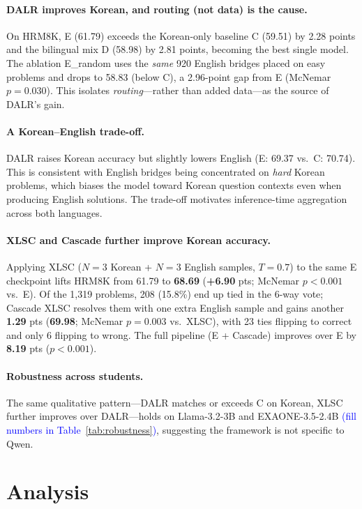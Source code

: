 \documentclass{article}
\newcommand{\note}[1]{\textcolor{blue}{{#1}}}
\begin{document}
\paragraph{DALR improves Korean, and routing (not data) is the cause.}
On HRM8K, E (61.79) exceeds the Korean-only baseline C (59.51) by 2.28
points and the bilingual mix D (58.98) by 2.81 points, becoming the
best single model. The ablation E\_random uses the \emph{same} 920
English bridges placed on easy problems and drops to 58.83 (below C),
a 2.96-point gap from E (McNemar $p{=}0.030$). This isolates
\emph{routing}---rather than added data---as the source of DALR's
gain.

\paragraph{A Korean--English trade-off.}
DALR raises Korean accuracy but slightly lowers English (E: 69.37 vs.\
C: 70.74). This is consistent with English bridges being concentrated
on \emph{hard} Korean problems, which biases the model toward Korean
question contexts even when producing English solutions. The trade-off
motivates inference-time aggregation across both languages.

\paragraph{XLSC and Cascade further improve Korean accuracy.}
Applying XLSC ($N{=}3$ Korean + $N{=}3$ English samples, $T{=}0.7$) to
the same E checkpoint lifts HRM8K from 61.79 to \textbf{68.69}
(\textbf{+6.90} pts; McNemar $p{<}0.001$ vs.\ E). Of the 1{,}319
problems, 208 (15.8\%) end up tied in the 6-way vote; Cascade XLSC
resolves them with one extra English sample and gains another
\textbf{1.29} pts (\textbf{69.98}; McNemar $p{=}0.003$ vs.\ XLSC), with
23 ties flipping to correct and only 6 flipping to wrong. The full
pipeline (E + Cascade) improves over E by \textbf{8.19} pts
($p{<}0.001$).

\paragraph{Robustness across students.}
The same qualitative pattern---DALR matches or exceeds C on Korean,
XLSC further improves over DALR---holds on Llama-3.2-3B and
EXAONE-3.5-2.4B \note{(fill numbers in Table~\ref{tab:robustness})},
suggesting the framework is not specific to Qwen.

\section{Analysis}
\end{document}
